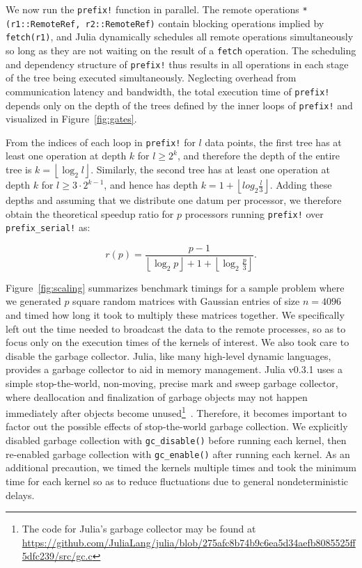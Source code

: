 \documentclass{sig-alternate}
\newcommand{\code}[1]{\texttt{#1}}
\newcommand{\floor}[1]{\left\lfloor #1 \right\rfloor}
\begin{document}
We now run the \code{prefix!} function in parallel. The remote operations
\code{*(r1::RemoteRef, r2::RemoteRef)} contain blocking operations implied by
\code{fetch(r1)}, and Julia dynamically schedules all remote operations
simultaneously so long as they are not waiting on the result of a \code{fetch}
operation. The scheduling and dependency structure of \code{prefix!} thus
results in all operations in each stage of the tree being executed
simultaneously. Neglecting overhead from communication latency and bandwidth,
the total execution time of \code{prefix!} depends only on the depth of the
trees defined by the inner loops of \code{prefix!} and visualized in
Figure~\ref{fig:gates}.

From the indices of each loop in \code{prefix!} for $l$ data points, the first
tree has at least one operation at depth $k$ for $l \ge 2^k$, and therefore the
depth of the entire tree is $k = \floor{\log_2 l}$. Similarly, the second tree
has at least one operation at depth $k$ for $l \ge 3\cdot2^{k-1}$, and hence
has depth $k = 1 + \floor{log_2 \frac l 3}$. Adding these depths and assuming
that we distribute one datum per processor, we therefore obtain the theoretical
speedup ratio for $p$ processors running \code{prefix!} over
\code{prefix\allowbreak\_serial!} as:

\begin{equation}
    r (p) = \frac {p-1} {\floor{\log_2 p} + 1 + \floor{\log_2 \frac p 3}}.
    \label{eq:scaling-theory}
\end{equation}

Figure~\ref{fig:scaling} summarizes benchmark timings for a sample problem
where we generated $p$ square random matrices with Gaussian entries of size $n
= 4096$ and timed how long it took to multiply these matrices together.  We
specifically left out the time needed to broadcast the data to the remote
processes, so as to focus only on the execution times of the kernels of
interest. We also took care to disable the garbage collector. Julia, like many
high-level dynamic languages, provides a garbage collector to aid in memory
management. Julia v0.3.1 uses a simple stop-the-world, non-moving, precise mark
and sweep garbage collector, where deallocation and finalization of garbage
objects may not happen immediately after objects become unused\footnote{The
code for Julia's garbage collector may be found at
\url{https://github.com/JuliaLang/julia/blob/275afc8b74b9c6ea5d34aefb8085525ff5dfc239/src/gc.c}}~\cite{McCarthy1960}.
Therefore, it becomes important to factor out the possible effects of
stop-the-world garbage collection. We explicitly disabled garbage collection
with \code{gc\_disable()} before running each kernel, then re-enabled garbage
collection with \code{gc\_enable()} after running each kernel. As an additional
precaution, we timed the kernels multiple times and took the minimum time for
each kernel so as to reduce fluctuations due to general nondeterministic
delays.
\end{document}
